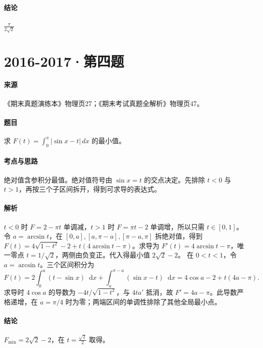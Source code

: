 \documentclass[UTF8,fontset=fandol,12pt,oneside,openany]{ctexrep}
\newcommand{\dd}{\mathop{}\!\mathrm d}
\theoremstyle{definition}
\begin{document}
\paragraph{结论}
$\frac\pi{2\sqrt2}$

\par\addvspace{18pt}\noindent\begin{minipage}{\linewidth}
\section{2016-2017·第四题}
\label{exam:11:q27}
\paragraph{来源} 《期末真题演练本》物理页27；《期末考试真题全解析》物理页47。
\paragraph{题目}
求 $F(t)=\int_0^\pi\lvert\sin x-t\rvert\,dx$ 的最小值。
\end{minipage}\par
\paragraph{考点与思路}
绝对值含参积分最值。绝对值符号由 $\sin x=t$ 的交点决定。先排除 $t<0$ 与 $t>1$，再按三个子区间拆开，得到可求导的表达式。
\paragraph{解析}
$t<0$ 时 $F=2-\pi t$ 单调减，$t>1$ 时 $F=\pi t-2$ 单调增，所以只需 $t\in[0,1]$。令 $a=\arcsin t$，在 $[0,a],[a,\pi-a],[\pi-a,\pi]$ 拆绝对值，得到 $F(t)=4\sqrt{1-t^2}-2+t(4\arcsin t-\pi)$。求导为 $F'(t)=4\arcsin t-\pi$，唯一零点 $t=1/\sqrt2$，两侧由负变正。代入得最小值 $2\sqrt2-2$。
在 $0<t<1$，令 $a=\arcsin t$。三个区间积分为
\[
F(t)=2\int_0^a(t-\sin x)\dd x+\int_a^{\pi-a}(\sin x-t)\dd x
=4\cos a-2+t(4a-\pi).
\]
求导时 $4\cos a$ 的导数为 $-4t/\sqrt{1-t^2}$，与 $4ta'$ 抵消，故 $F'=4a-\pi$。此导数严格递增，在 $a=\pi/4$ 时为零；两端区间的单调性排除了其他全局最小点。
\paragraph{结论}
$F_{\min}=2\sqrt2-2$，在 $t=\frac{\sqrt2}2$ 取得。
\end{document}
